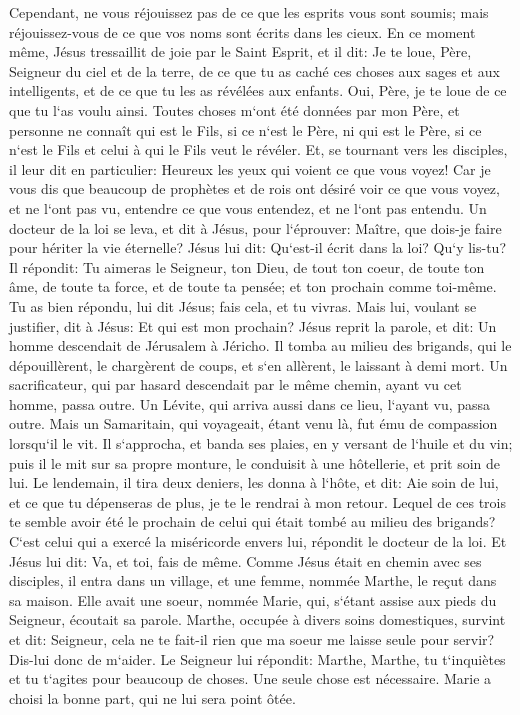 \verse Cependant, ne vous réjouissez pas de ce que les esprits vous sont soumis; mais réjouissez-vous de ce que vos noms sont écrits dans les cieux. 
\verse En ce moment même, Jésus tressaillit de joie par le Saint Esprit, et il dit: Je te loue, Père, Seigneur du ciel et de la terre, de ce que tu as caché ces choses aux sages et aux intelligents, et de ce que tu les as révélées aux enfants. Oui, Père, je te loue de ce que tu l`as voulu ainsi. 
\verse Toutes choses m`ont été données par mon Père, et personne ne connaît qui est le Fils, si ce n`est le Père, ni qui est le Père, si ce n`est le Fils et celui à qui le Fils veut le révéler. 
\verse Et, se tournant vers les disciples, il leur dit en particulier: Heureux les yeux qui voient ce que vous voyez! 
\verse Car je vous dis que beaucoup de prophètes et de rois ont désiré voir ce que vous voyez, et ne l`ont pas vu, entendre ce que vous entendez, et ne l`ont pas entendu. 
\verse Un docteur de la loi se leva, et dit à Jésus, pour l`éprouver: Maître, que dois-je faire pour hériter la vie éternelle? 
\verse Jésus lui dit: Qu`est-il écrit dans la loi? Qu`y lis-tu? 
\verse Il répondit: Tu aimeras le Seigneur, ton Dieu, de tout ton coeur, de toute ton âme, de toute ta force, et de toute ta pensée; et ton prochain comme toi-même. 
\verse Tu as bien répondu, lui dit Jésus; fais cela, et tu vivras. 
\verse Mais lui, voulant se justifier, dit à Jésus: Et qui est mon prochain? 
\verse Jésus reprit la parole, et dit: Un homme descendait de Jérusalem à Jéricho. Il tomba au milieu des brigands, qui le dépouillèrent, le chargèrent de coups, et s`en allèrent, le laissant à demi mort. 
\verse Un sacrificateur, qui par hasard descendait par le même chemin, ayant vu cet homme, passa outre. 
\verse Un Lévite, qui arriva aussi dans ce lieu, l`ayant vu, passa outre. 
\verse Mais un Samaritain, qui voyageait, étant venu là, fut ému de compassion lorsqu`il le vit. 
\verse Il s`approcha, et banda ses plaies, en y versant de l`huile et du vin; puis il le mit sur sa propre monture, le conduisit à une hôtellerie, et prit soin de lui. 
\verse Le lendemain, il tira deux deniers, les donna à l`hôte, et dit: Aie soin de lui, et ce que tu dépenseras de plus, je te le rendrai à mon retour. 
\verse Lequel de ces trois te semble avoir été le prochain de celui qui était tombé au milieu des brigands? 
\verse C`est celui qui a exercé la miséricorde envers lui, répondit le docteur de la loi. Et Jésus lui dit: Va, et toi, fais de même. 
\verse Comme Jésus était en chemin avec ses disciples, il entra dans un village, et une femme, nommée Marthe, le reçut dans sa maison. 
\verse Elle avait une soeur, nommée Marie, qui, s`étant assise aux pieds du Seigneur, écoutait sa parole. 
\verse Marthe, occupée à divers soins domestiques, survint et dit: Seigneur, cela ne te fait-il rien que ma soeur me laisse seule pour servir? Dis-lui donc de m`aider. 
\verse Le Seigneur lui répondit: Marthe, Marthe, tu t`inquiètes et tu t`agites pour beaucoup de choses. 
\verse Une seule chose est nécessaire. Marie a choisi la bonne part, qui ne lui sera point ôtée. 


